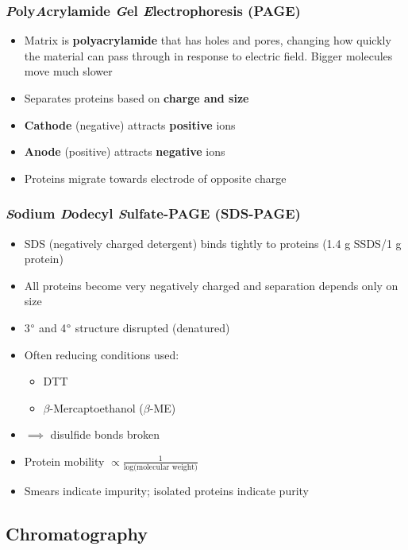 \documentclass[letterpaper, 12pt]{article}
\begin{document}
\subsubsection*{\textit{P}oly\textit{A}crylamide \textit{G}el \textit{E}lectrophoresis (PAGE)}

\begin{itemize}

\item Matrix is \textbf{polyacrylamide} that has holes and pores, changing how quickly the material can pass through in response to electric field. Bigger molecules move much slower
\item Separates proteins based on \textbf{charge and size}
\item \textbf{Cathode} (negative) attracts \textbf{positive} ions
\item \textbf{Anode} (positive) attracts \textbf{negative} ions
\item Proteins migrate towards electrode of opposite charge

\end{itemize}

\subsubsection*{\textit{S}odium \textit{D}odecyl \textit{S}ulfate-PAGE (SDS-PAGE)}

\begin{itemize}
\item SDS (negatively charged detergent) binds tightly to proteins (1.4 g SSDS/1 g protein)
\item All proteins become very negatively charged and separation depends only on size
\item 3$\degree$ and 4$\degree$ structure disrupted (denatured)
\item Often reducing conditions used: 
\begin{itemize}
\item DTT
\item $\beta$-Mercaptoethanol ($\beta$-ME)
\end{itemize}
\item $\implies$ disulfide bonds broken
\item Protein mobility $\displaystyle \propto \frac{1}{\log \text{(molecular weight)}}$
\item Smears indicate impurity; isolated proteins indicate purity
\end{itemize}

\subsection*{Chromatography}
\end{document}

